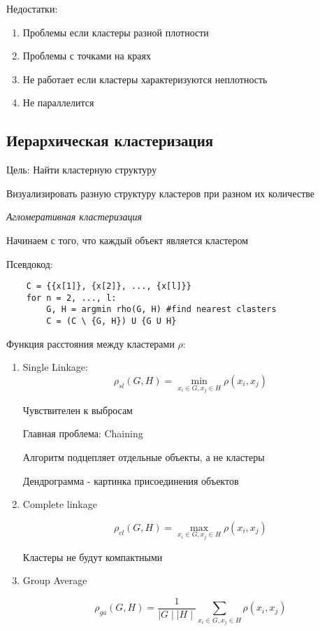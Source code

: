 \documentclass[a4paper, 12pt]{article}
\begin{document}
Недостатки:

\begin{enumerate}
    \item Проблемы если кластеры разной плотности
    \item Проблемы с точками на краях
    \item Не работает если кластеры характеризуются неплотность
    \item Не параллелится
\end{enumerate}

\subsection{Иерархическая кластеризация}

Цель: Найти кластерную структуру

Визуализировать разную структуру кластеров при разном 
их количестве

\textit{Агломеративная кластеризация}

Начинаем с того, что каждый объект является кластером

Псевдокод:

\begin{lstlisting}
    C = {{x[1]}, {x[2]}, ..., {x[l]}}
    for n = 2, ..., l:
        G, H = argmin rho(G, H) #find nearest clasters
        C = (C \ {G, H}) U {G U H}    
\end{lstlisting}

Функция расстояния между кластерами $\rho$:

\begin{enumerate}
    \item Single Linkage:
    \[\rho_{sl}(G, H) = 
    \min_{x_i \in G, x_j \in H}\rho(x_i, x_j)\]

    Чувствителен к выбросам

    Главная проблема: Chaining

    Алгоритм подцепляет отдельные объекты, а не кластеры

    Дендрограмма - картинка присоединения объектов

    \item Complete linkage
    
    \[\rho_{cl}(G, H) = 
    \max_{x_i \in G, x_j \in H}\rho(x_i, x_j)\]

    Кластеры не будут компактными

    \item Group Average
    
    \[\rho_{ga}(G, H) = \frac{1}{\mid G \mid \mid H \mid} 
    \sum_{x_i \in G, x_j \in H}\rho(x_i, x_j)\]
\end{enumerate}
\end{document}
